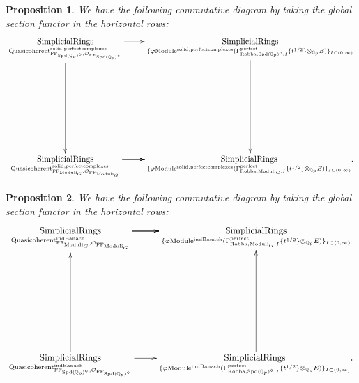 \documentclass[12pt]{book}
\newtheorem{proposition}{Proposition}
\theoremstyle{definition}
\begin{document}
\begin{proposition}
We have the following commutative diagram by taking the global section functor in the horizontal rows:
\[\displayindent=+0in
\xymatrix@C+0in@R+7pc{
\underset{\mathrm{Quasicoherent}^{\mathrm{solid,perfectcomplexes}}_{\mathrm{FF}_{\mathrm{Spd}(\mathbb{Q}_p)^\diamond},\mathcal{O}_{\mathrm{FF}_{\mathrm{Spd}(\mathbb{Q}_p)^\diamond}}}}{\mathrm{SimplicialRings}}\ar[d] \ar[r] &\underset{\{\varphi\mathrm{Module}^{\mathrm{solid,perfectcomplexes}}(\Gamma^\text{perfect}_{\text{Robba},{\mathrm{Spd}(\mathbb{Q}_p)^\diamond},I}\{t^{1/2}\}\otimes_{\mathbb{Q}_p}E)\}_{I\subset (0,\infty)}}{\mathrm{SimplicialRings}}\ar[d]\\
\underset{\mathrm{Quasicoherent}^{\mathrm{solid,perfectcomplexes}}_{\mathrm{FF}_{\mathrm{Moduli}_G},\mathcal{O}_{\mathrm{FF}_{\mathrm{Moduli}_G}}}}{\mathrm{SimplicialRings}}  \ar[r] \ar[r] \ar[r] &\underset{\{\varphi\mathrm{Module}^{\mathrm{solid,perfectcomplexes}}(\Gamma^\text{perfect}_{\text{Robba},{\mathrm{Moduli}_G},I}\{t^{1/2}\}\otimes_{\mathbb{Q}_p}E)\}_{I\subset (0,\infty)}}{\mathrm{SimplicialRings}}.  
}
\]
\end{proposition}

\begin{proposition}
We have the following commutative diagram by taking the global section functor in the horizontal rows:
\[\displayindent=+0in
\xymatrix@R+7pc{
\underset{\mathrm{Quasicoherent}^{\mathrm{indBanach}}_{\mathrm{FF}_{\mathrm{Moduli}_G},\mathcal{O}_{\mathrm{FF}_{\mathrm{Moduli}_G}}}}{\mathrm{SimplicialRings}}  \ar[r] \ar[r] \ar[r] &\underset{\{\varphi\mathrm{Module}^{\mathrm{indBanach}}(\Gamma^\text{perfect}_{\text{Robba},{\mathrm{Moduli}_G},I}\{t^{1/2}\}\otimes_{\mathbb{Q}_p}E)\}_{I\subset (0,\infty)}}{\mathrm{SimplicialRings}}   \\
\underset{\mathrm{Quasicoherent}^{\mathrm{indBanach}}_{\mathrm{FF}_{\mathrm{Spd}(\mathbb{Q}_p)^\diamond},\mathcal{O}_{\mathrm{FF}_{\mathrm{Spd}(\mathbb{Q}_p)^\diamond}}}}{\mathrm{SimplicialRings}} \ar[u]\ar[r] &\underset{\{\varphi\mathrm{Module}^\text{indBanach}(\Gamma^\text{perfect}_{\text{Robba},{\mathrm{Spd}(\mathbb{Q}_p)^\diamond},I}\{t^{1/2}\}\otimes_{\mathbb{Q}_p}E)\}_{I\subset (0,\infty)}}{\mathrm{SimplicialRings}}.\ar[u]  
}
\]
\end{proposition}
\end{document}
